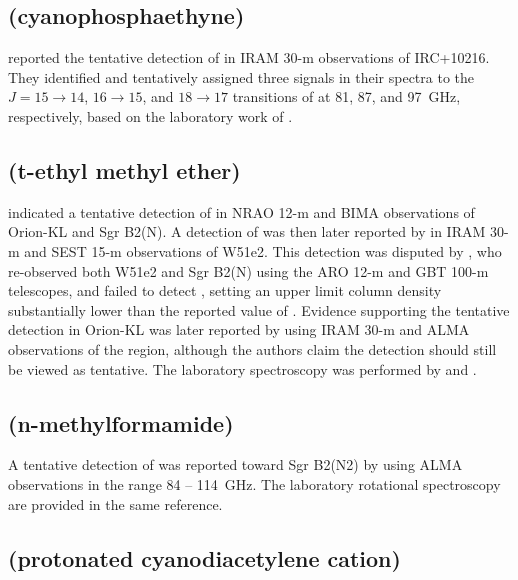 \documentclass[twocolumn]{aastex631}
\newcommand{\update}[1]{{#1}}
\begin{document}
 
    \subsection{ (cyanophosphaethyne)}
    \label{NCCP}
    
    \citet{Agundez:2014gm} reported the tentative detection of  in IRAM 30-m observations of IRC+10216.  They identified and tentatively assigned three signals in their spectra to the $J = 15\rightarrow14$, $16\rightarrow15$, and $18\rightarrow17$ transitions of  at 81, 87, and 97~GHz, respectively, based on the laboratory work of \citet{Bizzocchi:2001ij}.
    
    \subsection{ (t-ethyl methyl ether)}
    \label{C2H5OCH3}
    
    \citet{Charnley:2001dc} indicated a tentative detection of  in NRAO 12-m and BIMA observations of Orion-KL and Sgr B2(N).  A detection of  was then later reported by \citet{Fuchs:2005fw} in IRAM 30-m and SEST 15-m observations of W51e2.  This detection was disputed by \citet{Carroll:2015dp}, who re-observed both W51e2 and Sgr B2(N) using the ARO 12-m and GBT 100-m telescopes, and failed to detect , setting an upper limit column density substantially lower than the reported value of \citet{Fuchs:2005fw}.  Evidence supporting the tentative detection in Orion-KL was later reported by \citet{Tercero:2015dl} using IRAM 30-m and ALMA observations of the region, although the authors claim the detection should still be viewed as tentative.  The laboratory spectroscopy was performed by \citet{Hayashi:1975up} and \citet{Fuchs:2003yd}.

    \subsection{ (n-methylformamide)}
    \label{CH3NHCHO}
    
    A tentative detection of  was reported toward Sgr B2(N2) by \citet{Belloche:2017bb} using ALMA observations in the range 84 -- 114~GHz.  The laboratory rotational spectroscopy are provided in the same reference.  
    
    \subsection{\update{ (protonated cyanodiacetylene cation)}}
    \label{HC5NH+}
    
\end{document}
